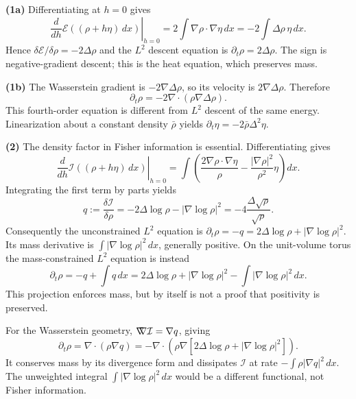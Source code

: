 \documentclass[11pt,a4paper]{article}
\theoremstyle{exostyle}
\newcommand{\gradW}{\mathord{\nabla\mkern-9.3mu\nabla}}
\begin{document}
\begin{solution}
\textbf{(1a)} Differentiating at $h=0$ gives
\[
\left.\frac d{dh}\mathcal E((\rho+h\eta)\,dx)\right|_{h=0}
=2\int\nabla\rho\cdot\nabla\eta\,dx=-2\int\Delta\rho\,\eta\,dx.
\]
Hence $\delta\mathcal E/\delta\rho=-2\Delta\rho$ and the $L^2$ descent equation is $\partial_t\rho=2\Delta\rho$. The sign is negative-gradient descent; this is the heat equation, which preserves mass.

\textbf{(1b)} The Wasserstein gradient is $-2\nabla\Delta\rho$, so its velocity is $2\nabla\Delta\rho$. Therefore
\[
\partial_t\rho=-2\nabla\cdot(\rho\nabla\Delta\rho).
\]
This fourth-order equation is different from $L^2$ descent of the same energy. Linearization about a constant density $\bar\rho$ yields $\partial_t\eta=-2\bar\rho\Delta^2\eta$.

\textbf{(2)} The density factor in Fisher information is essential. Differentiating gives
\[
\left.\frac d{dh}\mathcal I((\rho+h\eta)\,dx)\right|_{h=0}
=\int\left(\frac{2\nabla\rho\cdot\nabla\eta}{\rho}
-\frac{|\nabla\rho|^2}{\rho^2}\eta\right)dx.
\]
Integrating the first term by parts yields
\[
q:=\frac{\delta\mathcal I}{\delta\rho}
=-2\Delta\log\rho-|\nabla\log\rho|^2
=-4\frac{\Delta\sqrt\rho}{\sqrt\rho}.
\]
Consequently the unconstrained $L^2$ equation is
$\partial_t\rho=-q=2\Delta\log\rho+|\nabla\log\rho|^2$.
Its mass derivative is $\int|\nabla\log\rho|^2\,dx$, generally positive. On the unit-volume torus the mass-constrained $L^2$ equation is instead
\[
\partial_t\rho=-q+\int q\,dx
=2\Delta\log\rho+|\nabla\log\rho|^2-\int|\nabla\log\rho|^2\,dx.
\]
This projection enforces mass, but by itself is not a proof that positivity is preserved.

For the Wasserstein geometry, $\gradW\mathcal I=\nabla q$, giving
\[
\partial_t\rho=\nabla\cdot(\rho\nabla q)
=-\nabla\cdot\left(\rho\nabla[2\Delta\log\rho+|\nabla\log\rho|^2]\right).
\]
It conserves mass by its divergence form and dissipates $\mathcal I$ at rate $-\int\rho|\nabla q|^2\,dx$. The unweighted integral $\int|\nabla\log\rho|^2\,dx$ would be a different functional, not Fisher information.
\end{solution}
\end{document}
